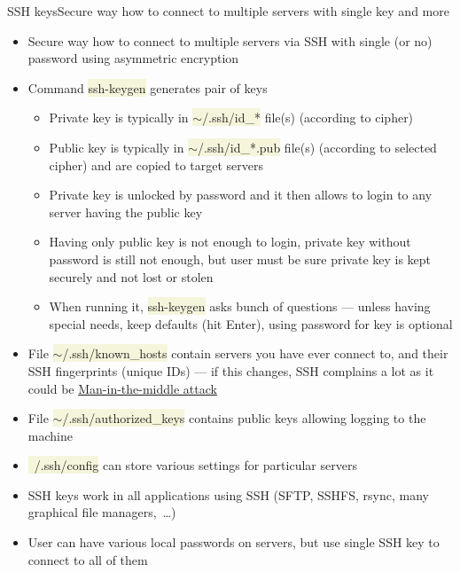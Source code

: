 \documentclass[compress, ucs, xelatex, 11pt, xcolor=svgnames, aspectratio=169,
	hyperref={
		bookmarks=true,
		unicode=true,
		colorlinks=true,
		pdftitle={Linux, command line and MetaCentrum},
		plainpages=false,
		pdfauthor={Vojtech Zeisek},
		pdfsubject={Course about use of Linux command line, writing shell scripts and using MetaCentrum of CESNET},
		pdfcreator={XeLaTeX},
		pdfkeywords={Linux, GNU, BASH, shell, command line, MetaCentrum},
		linkcolor=DarkRed, %
		anchorcolor=DarkBlue, %
		citecolor=Indigo, %
		filecolor=NavyBlue, %
		menucolor=DarkMagenta, %
		urlcolor=DarkBlue, %
		pdftex},
	url={hyphens, lowtilde} %
	]{beamer}
\renewcommand{\texttt}[1]{\colorbox{Beige}{{\ttfamily #1}}}
\begin{document}
\begin{frame}[allowframebreaks]{SSH keys}{Secure way how to connect to multiple servers with single key and more}
	\begin{itemize}
		\item Secure way how to connect to multiple servers via SSH with single (or no) password using asymmetric encryption
		\item Command \texttt{ssh-keygen} generates pair of keys
		\begin{itemize}
			\item Private key is typically in \texttt{$\sim$/.ssh/id\_*} file(s) (according to cipher)
			\item Public key is typically in \texttt{$\sim$/.ssh/id\_*.pub} file(s) (according to selected cipher) and are copied to target servers
			\item Private key is unlocked by password and it then allows to login to any server having the public key
			\item Having only public key is not enough to login, private key without password is still not enough, but user must be sure private key is kept securely and not lost or stolen
			\item When running it, \texttt{ssh-keygen} asks bunch of questions --- unless having special needs, keep defaults (hit Enter), using password for key is optional
		\end{itemize}
		\item File \texttt{$\sim$/.ssh/known\_hosts} contain servers you have ever connect to, and their SSH fingerprints (unique IDs) --- if this changes, SSH complains a lot as it could be \href{https://en.wikipedia.org/wiki/Man-in-the-middle_attack}{Man-in-the-middle attack}
		\item File \texttt{$\sim$/.ssh/authorized\_keys} contains public keys allowing logging to the machine
		\item \texttt{~/.ssh/config} can store various settings for particular servers
		\item SSH keys work in all applications using SSH (SFTP, SSHFS, rsync, many graphical file managers,~\ldots)
		\item User can have various local passwords on servers, but use single SSH key to connect to all of them
	\end{itemize}
\end{frame}
\end{document}
